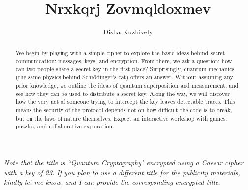 \documentclass[12pt,a4paper]{article}
\title{Nrxkqrj Zovmqldoxmev}
\author{Disha Kuzhively}
\begin{document}
\maketitle
\begin{abstract}
We begin by playing with a simple cipher to explore the basic ideas behind secret communication: messages, keys, and encryption. From there, we ask a question: how can two people share a secret key in the first place? Surprisingly, quantum mechanics (the same physics behind Schr{\"o}dinger's cat) offers an answer. Without assuming any prior knowledge, we outline the ideas of quantum superposition and measurement, and see how they can be used to distribute a secret key. Along the way, we will discover how the very act of someone trying to intercept the key leaves detectable traces. This means the security of the protocol depends not on how difficult the code is to break, but on the laws of nature themselves. Expect an interactive workshop with games, puzzles, and collaborative exploration.
\end{abstract}

\textit{Note that the title is ``Quantum Cryptography" encrypted using a Caesar cipher with a key of 23. If you plan to use a different title for the publicity materials, kindly let me know, and I can provide the corresponding encrypted title.}
\end{document}
